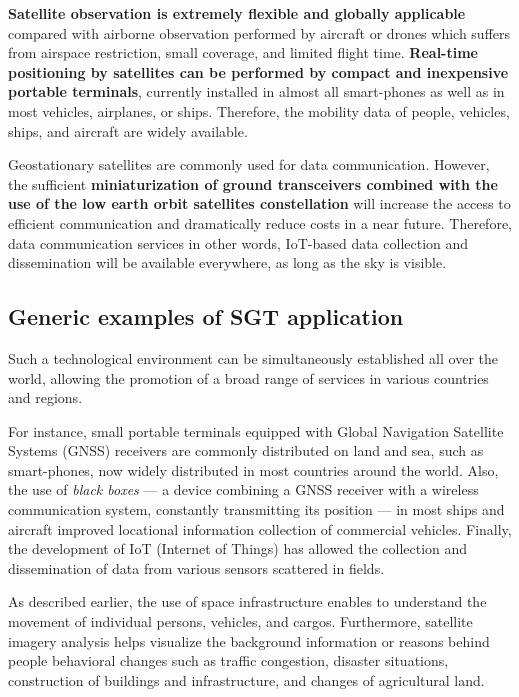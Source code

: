 \vspace{0.4 cm}

\textbf{Satellite observation is extremely flexible and globally applicable} compared with airborne observation performed by aircraft or drones which suffers from airspace restriction, small coverage, and limited flight time. \textbf{Real-time positioning by satellites can be performed by compact and inexpensive portable terminals}, currently installed in almost all smart-phones as well as in most vehicles, airplanes, or ships. Therefore, the mobility data of people, vehicles, ships, and aircraft are widely available.

\vspace{0.4 cm}

Geostationary satellites are commonly used for data communication. However, the sufficient \textbf{miniaturization of ground transceivers combined with the use of the low earth orbit satellites constellation} will increase the access to efficient communication and dramatically reduce costs in a near future. Therefore, data communication services in other words, IoT-based data collection and dissemination will be available everywhere, as long as the sky is visible. 


\subsection{Generic examples of SGT application}

\tab Such a technological environment can be simultaneously established all over the world, allowing the promotion of a broad range of services in various countries and regions. 

For instance, small portable terminals equipped with Global Navigation Satellite Systems (GNSS) receivers are commonly distributed on land and sea, such as smart-phones, now widely distributed in most countries around the world. Also, the use of \textit{black boxes} --- a device combining a GNSS receiver with a wireless communication system, constantly transmitting its position --- in most ships and aircraft improved locational information collection of commercial vehicles. Finally, the development of IoT (Internet of Things) has allowed the collection and dissemination of data from various sensors scattered in fields.

As described earlier, the use of space infrastructure enables to understand the movement of individual persons, vehicles, and cargos. Furthermore, satellite imagery analysis helps visualize the background information or reasons behind people behavioral changes such as traffic congestion, disaster situations, construction of buildings and infrastructure, and changes of agricultural land.

